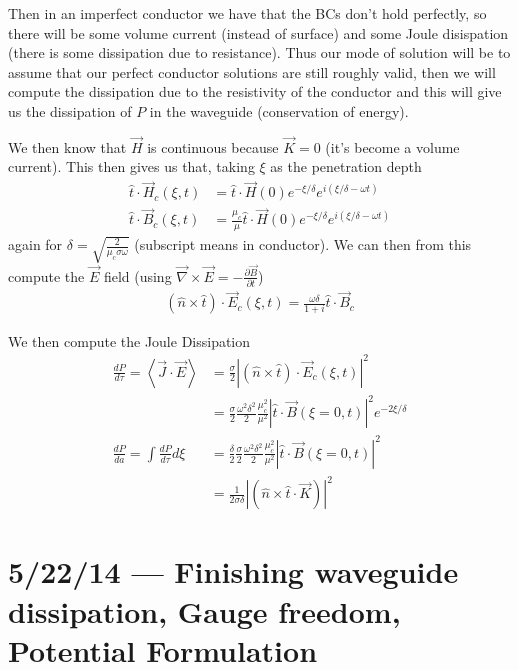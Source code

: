 \documentclass[10pt]{report}
\newcommand{\rd}[2]{\frac{d#1}{d#2}}
\newcommand{\pd}[2]{\frac{\partial #1}{\partial#2}}
\newcommand{\expvalue}[1]{\left<#1\right>}
\newcommand{\abs}[1]{\left|#1\right|}
\begin{document}
Then in an imperfect conductor we have that the BCs don't hold perfectly, so there will be some volume current (instead of surface) and some Joule disispation (there is some dissipation due to resistance). Thus our mode of solution will be to assume that our perfect conductor solutions are still roughly valid, then we will compute the dissipation due to the resistivity of the conductor and this will give us the dissipation of $P$ in the waveguide (conservation of energy). 

We then know that $\vec{H}$ is continuous because $\vec{K} = 0$ (it's become a volume current). This then gives us that, taking $\xi$ as the penetration depth
\begin{align}
    \hat{t} \cdot \vec{H}_c(\xi,t) &= \hat{t} \cdot \vec{H}(0) e^{-\xi/\delta}e^{i\left( \xi/\delta - \omega t \right)}\\
    \hat{t} \cdot \vec{B}_c(\xi,t) &= \frac{\mu_c}{\mu}\hat{t} \cdot \vec{H}(0) e^{-\xi/\delta}e^{i\left( \xi/\delta - \omega t \right)}
\end{align}
again for $\delta = \sqrt{\frac{2}{\mu_c \sigma \omega}}$ (subscript means in conductor). We can then from this compute the $\vec{E}$ field (using $\vec{\nabla} \times \vec{E} = -\pd{\vec{B}}{t}$)
\begin{align}
    \left( \hat{n} \times \hat{t} \right) \cdot \vec{E}_c\left( \xi,t \right) = \frac{\omega \delta}{1 + i}\hat{t} \cdot \vec{B}_c
\end{align}

We then compute the Joule Dissipation
\begin{align}
    \rd{P}{\tau} = \expvalue{\vec{J} \cdot \vec{E}} &= \frac{\sigma}{2}\abs{\left( \hat{n} \times \hat{t} \right) \cdot \vec{E}_c(\xi,t)}^2\\
    &= \frac{\sigma}{2}\frac{\omega^2 \delta^2}{2} \frac{\mu_c^2}{\mu^2}\abs{\hat{t} \cdot \vec{B}(\xi=0,t)}^2e^{-2\xi/\delta}\\
    \rd{P}{a} = \int \rd{P}{\tau}d\xi &= \frac{\delta}{2}\frac{\sigma}{2}\frac{\omega^2 \delta^2}{2} \frac{\mu_c^2}{\mu^2}\abs{\hat{t} \cdot \vec{B}(\xi=0,t)}^2\\
    &= \frac{1}{2\sigma\delta}\abs{\left( \hat{n} \times \hat{t} \cdot \vec{K} \right)}^2
\end{align}

\chapter{5/22/14 --- Finishing waveguide dissipation, Gauge freedom, Potential Formulation}
\end{document}
